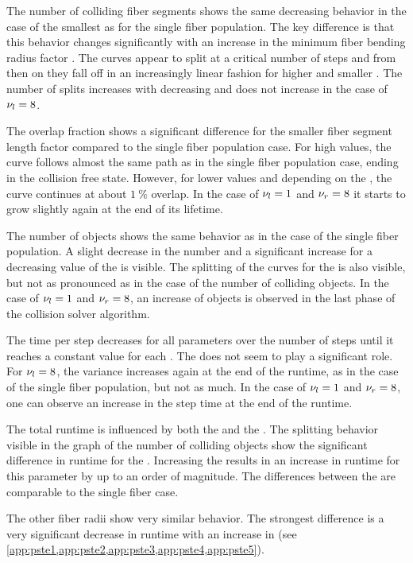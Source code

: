 %
The number of colliding fiber segments shows the same decreasing behavior in the case of the smallest \segRadiusFactor{} as for the single fiber population.
The key difference is that this behavior changes significantly with an increase in the minimum fiber bending radius factor \segRadiusFactor{}.
The curves appear to split at a critical number of steps and from then on they fall off in an increasingly linear fashion for higher \segRadiusFactor{} and smaller \segLengthFactor{}.
The number of splits increases with decreasing \segLengthFactor{} and does not increase in the case of $\textnormal{$\nu_{l}$} = \SI{8}{}$.
\par
%
The overlap fraction shows a significant difference for the smaller fiber segment length factor \segLengthFactor{} compared to the single fiber population \pfbs{} case.
For high \segLengthFactor{} values, the curve follows almost the same path as in the single fiber population case, ending in the collision free state.
However, for lower values and depending on the \segRadius{}, the curve continues at about $\SI{1}{\percent}$ overlap.
In the case of $\textnormal{$\nu_{l}$} = \SI{1}{}$ and $\textnormal{$\nu_{r}$} = \SI{8}{}$ it starts to grow slightly again at the end of its lifetime.
\par
%
The number of objects shows the same behavior as in the case of the single fiber population.
A slight decrease in the number and a significant increase for a decreasing value of the \segLengthFactor{} is visible.
The splitting of the curves for the \segRadiusFactor{} is also visible, but not as pronounced as in the case of the number of colliding objects.
In the case of $\textnormal{$\nu_{l}$} = \SI{1}{}$ and $\textnormal{$\nu_{r}$} = \SI{8}{}$, an increase of objects is observed in the last phase of the collision solver algorithm.
\par
% 
The time per step decreases for all parameters over the number of steps until it reaches a constant value for each \segLengthFactor{}.
The \segRadiusFactor{} does not seem to play a significant role.
For $\textnormal{$\nu_{l}$}{} = \SI{8}{}$, the variance increases again at the end of the runtime, as in the case of the single fiber population, but not as much.
In the case of $\textnormal{$\nu_{l}$}{} = \SI{1}{}$ and $\textnormal{$\nu_{r}$} = \SI{8}{}$, one can observe an increase in the step time at the end of the runtime.
\par
%
The total runtime is influenced by both the \segLengthFactor{} and the \segRadiusFactor{}.
The splitting behavior visible in the graph of the number of colliding objects show the significant difference in runtime for the \segRadiusFactor{}.
Increasing the \segRadiusFactor{} results in an increase in runtime for this parameter by up to an order of magnitude.
The differences between the \segLengthFactor{} are comparable to the single fiber case.
\par
%
The other fiber radii show very similar behavior.
The strongest difference is a very significant decrease in runtime with an increase in \fiberRadiusMean{} (see \cref{app:pste1,app:pste2,app:pste3,app:pste4,app:pste5}).
%
%
%
